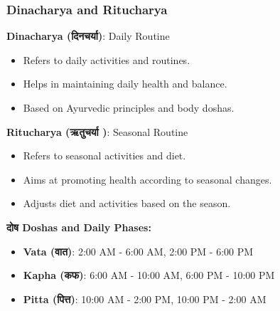 \begin{frame}[fragile]\frametitle{Dinacharya and Ritucharya}
    \textbf{Dinacharya (दिनचर्या)}: Daily Routine
    \begin{itemize}
        \item Refers to daily activities and routines.
        \item Helps in maintaining daily health and balance.
        \item Based on Ayurvedic principles and body doshas.
    \end{itemize}

    \textbf{Ritucharya (ऋतुचर्या )}: Seasonal Routine
    \begin{itemize}
        \item Refers to seasonal activities and diet.
        \item Aims at promoting health according to seasonal changes.
        \item Adjusts diet and activities based on the season.
    \end{itemize}

    \textbf{दोष  Doshas and Daily Phases:}
    \begin{itemize}
        \item \textbf{Vata (वात)}: 2:00 AM - 6:00 AM, 2:00 PM - 6:00 PM
        \item \textbf{Kapha (कफ)}: 6:00 AM - 10:00 AM, 6:00 PM - 10:00 PM
        \item \textbf{Pitta (पित्त)}: 10:00 AM - 2:00 PM, 10:00 PM - 2:00 AM
    \end{itemize}
\end{frame}

